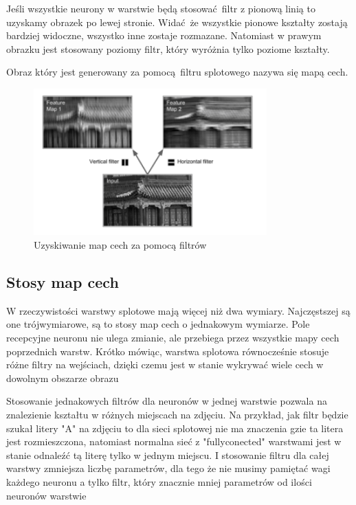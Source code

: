 \documentclass{article}
\begin{document}
Jeśli wszystkie neurony w warstwie będą stosować filtr z pionową linią to uzyskamy obrazek po lewej stronie. Widać że wszystkie pionowe kształty zostają bardziej widoczne, wszystko inne zostaje rozmazane. Natomiast w prawym obrazku jest stosowany poziomy filtr, który wyróżnia tylko poziome kształty.

Obraz który jest generowany za pomocą filtru splotowego nazywa się mapą cech.

\begin{figure}[H]
	\centering
	\includegraphics[width=0.8\textwidth,keepaspectratio=true]{filters}
	\caption{Uzyskiwanie map cech za pomocą filtrów \cite{geron}}
	\label{filters}
\end{figure}

\subsection{Stosy map cech}
W rzeczywistości warstwy splotowe mają więcej niż dwa wymiary. Najczęstszej są one trójwymiarowe, są to stosy map cech o jednakowym wymiarze. Pole recepcyjne neuronu nie ulega zmianie, ale przebiega przez wszystkie mapy cech poprzednich warstw. Krótko mówiąc, warstwa splotowa równocześnie stosuje różne filtry na wejściach, dzięki czemu jest w stanie wykrywać wiele cech w dowolnym obszarze obrazu \cite{geron}

Stosowanie jednakowych filtrów dla neuronów w jednej warstwie pozwala na znalezienie kształtu w różnych miejscach na zdjęciu. Na przykład, jak filtr będzie szukał litery "A" na zdjęciu to dla sieci splotowej nie ma znaczenia gzie ta litera jest rozmieszczona, natomiast normalna sieć z "fullyconected" warstwami jest w stanie odnaleźć tą literę tylko w jednym miejscu. I stosowanie filtru dla całej warstwy zmniejsza liczbę parametrów, dla tego że nie musimy pamiętać wagi każdego neuronu a tylko filtr, który znacznie mniej parametrów od ilości neuronów warstwie\cite{geron}
\end{document}

